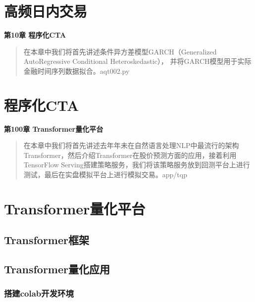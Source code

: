 \documentclass{article}
\begin{document}
\section{高频日内交易}

\maketitle\begin{center}
\Large \textbf{第10章 程序化CTA}
\end{center}
\begin{abstract}
在本章中我们将首先讲述条件异方差模型GARCH（Generalized AutoRegressive Conditional Heteroskedastic），
并将GARCH模型用于实际金融时间序列数据拟合。aqt002.py
\end{abstract}
\section{程序化CTA}

\maketitle\begin{center}
\Large \textbf{第100章 \quad Transformer量化平台}
\end{center}
\begin{abstract}
在本章中我们将首先讲述去年年未在自然语言处理NLP中最流行的架构Transformer，然后介绍Transformer在股价预测方面的应用，接着利用TensorFlow Serving搭建策略服务，我们将该策略服务放到回测平台上进行测试，最后在实盘模拟平台上进行模拟交易。app/tqp
\end{abstract}
\section{Transformer量化平台}
\subsection{Transformer框架}
\subsection{Transformer量化应用}
\subsubsection{搭建colab开发环境}
\end{document}
